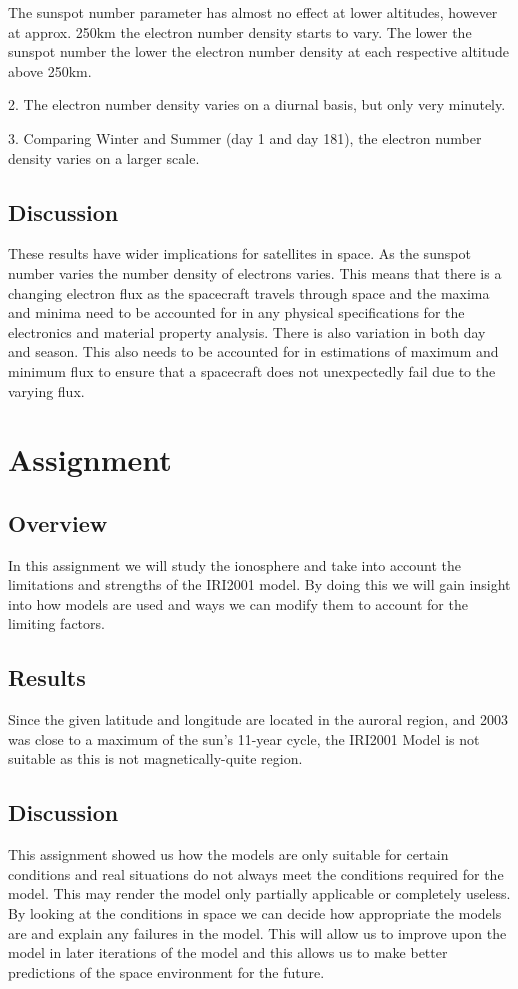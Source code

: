 The sunspot number parameter has almost no effect at lower altitudes, however at approx. 250km the electron number density starts to vary. The lower the sunspot number the lower the electron number density at each respective altitude above 250km.

2. The electron number density varies on a diurnal basis, but only very minutely. 

3. Comparing Winter and Summer (day 1 and day 181), the electron number density varies on a larger scale.
\subsection{Discussion}
These results have wider implications for satellites
 in space. As the sunspot number varies the number density of electrons varies. This means that there is a changing electron flux as the spacecraft travels through space and the maxima and minima need to be accounted for in any physical specifications for the
 electronics and material property analysis. There is also variation in both day and season. This also needs to be accounted for in estimations of maximum and minimum flux to ensure that a spacecraft does not unexpectedly fail due to the varying flux.


\section{Assignment}
\subsection{Overview}
In this assignment we will study the ionosphere and
 take into account the limitations and strengths of the IRI2001 model. By doing this we will gain insight into how models are used and ways we can modify them to account for the limiting factors.
\subsection{Results}
Since the given latitude and longitude are located in the auroral region, and 2003 was close to a maximum of the sun's 11-year cycle, the IRI2001 Model is not suitable as this is not magnetically-quite region.
\subsection{Discussion}
This assignment showed us how the models are only
 suitable for certain conditions and real situations do not always meet the conditions required for the model. This may render the model only partially applicable or completely useless. By looking at the conditions in space we can decide how appropriate the
 models are and explain any failures in the model. This will allow us to improve upon the model in later iterations of the model and this allows us to make better predictions of the space environment for the future.


